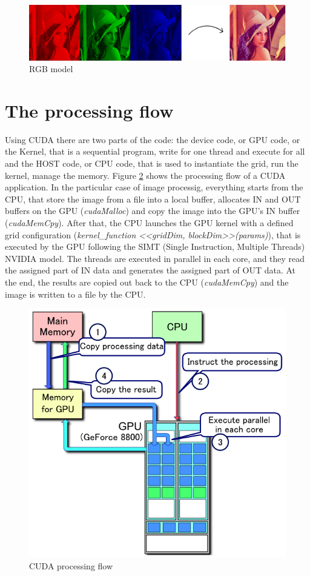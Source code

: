 \documentclass[a4paper]{article}
\begin{document}
\begin{figure}[ht]
    \centering
    \includegraphics[width=0.7\linewidth]{rgb}
    \caption{RGB model}
    \label{fig:rgb}
\end{figure}
\FloatBarrier

\section{The processing flow}
\label{sec:cpf}
Using CUDA there are two parts of the code: the device code, or GPU code, or the Kernel, that is a sequential program, write for one thread and execute for all and the HOST code, or CPU code, that is used to instantiate the grid, run the kernel, manage the memory. Figure \ref{fig:flow} shows the processing flow of a CUDA application. In the particular case of image processig, everything starts from the CPU, that store the image from a file into a local buffer, allocates IN and OUT buffers on the GPU (\textit{cudaMalloc}) and copy the image into the GPU's IN buffer (\textit{cudaMemCpy}). After that, the CPU launches the GPU kernel with a defined grid configuration (\textit{kernel\_function <<gridDim, blockDim>>(params)}), that is executed by the GPU following the SIMT (Single Instruction, Multiple Threads) NVIDIA model. The threads are executed in parallel in each core, and they read the assigned part of IN data and generates the assigned part of OUT data. At the end, the results are copied out back to the CPU (\textit{cudaMemCpy}) and the image is written to a file by the CPU.

\begin{figure}[ht]
    \centering
    \includegraphics[width=0.5\linewidth]{flow}
    \caption{CUDA processing flow}
    \label{fig:flow}
\end{figure}
\FloatBarrier
\end{document}
